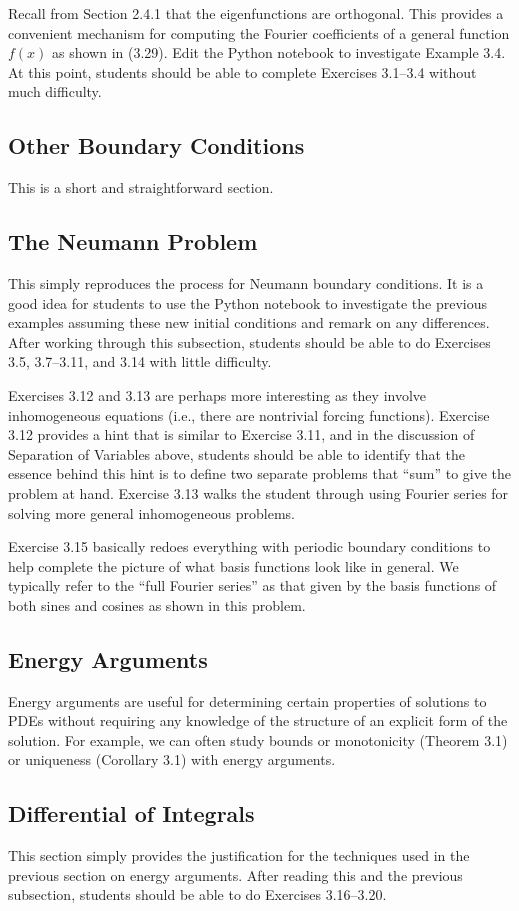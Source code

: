 \documentclass{amsart}
\theoremstyle{plain}
\theoremstyle{definition}
\theoremstyle{remark}
\theoremstyle{definition}
\numberwithin{equation}{section}
\numberwithin{equation}{section}
\begin{document}
Recall from Section 2.4.1 that the eigenfunctions are orthogonal. 
This provides a convenient mechanism for computing the Fourier coefficients of a general function $f(x)$ as shown in (3.29).
Edit the Python notebook to investigate Example 3.4.
At this point, students should be able to complete Exercises 3.1--3.4 without much difficulty. 


\subsection{Other Boundary Conditions}

This is a short and straightforward section.

\subsection{The Neumann Problem}

This simply reproduces the process for Neumann boundary conditions.
It is a good idea for students to use the Python notebook to investigate the previous examples assuming these new initial conditions and remark on any differences. 
After working through this subsection, students should be able to do Exercises 3.5, 3.7--3.11, and 3.14 with little difficulty.

Exercises 3.12 and 3.13 are perhaps more interesting as they involve inhomogeneous equations (i.e., there are nontrivial forcing functions). 
Exercise 3.12 provides a hint that is similar to Exercise 3.11, and in the discussion of Separation of Variables above, students should be able to identify that the essence behind this hint is to define two separate problems that ``sum'' to give the problem at hand.
Exercise 3.13 walks the student through using Fourier series for solving more general inhomogeneous problems. 

Exercise 3.15 basically redoes everything with periodic boundary conditions to help complete the picture of what basis functions look like in general.
We typically refer to the ``full Fourier series'' as that given by the basis functions of both sines and cosines as shown in this problem.

\subsection{Energy Arguments}

Energy arguments are useful for determining certain properties of solutions to PDEs without requiring any knowledge of the structure of an explicit form of the solution.
For example, we can often study bounds or monotonicity (Theorem 3.1) or uniqueness (Corollary 3.1) with energy arguments.

\subsection{Differential of Integrals}

This section simply provides the justification for the techniques used in the previous section on energy arguments.
After reading this and the previous subsection, students should be able to do Exercises 3.16--3.20. 
\end{document}
